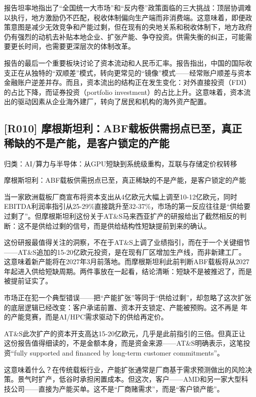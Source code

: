 \documentclass[11pt]{ctexart}
\begin{document}
报告坦率地指出了“全国统一大市场”和“反内卷”政策面临的三大挑战：顶层协调难以执行，地方激励仍不匹配，税收体制偏向生产端而非消费端。这意味着，即便政策意图是减少无效竞争和产能过剩，但在现有的央地关系和税收体制下，地方政府仍有强烈的动机去补贴本地企业、扩张产能、争夺投资。供需失衡的纠正，可能需要更长时间，也需要更深层次的体制改革。

报告的最后一个重要板块讨论了资本流动和人民币汇率。报告指出，中国的国际收支正在从独特的“双顺差”模式，转向更常见的“镜像”模式——经常账户顺差与资本金融账户逆差并存。而且，资本流出的结构正在发生变化：对外直接投资（FDI）的占比下降，而证券投资（portfolio investment）的占比上升。这意味着，资本流出的驱动因素从企业海外建厂，转向了居民和机构的海外资产配置。

\subsection{[R010] 摩根斯坦利：ABF载板供需拐点已至，真正稀缺的不是产能，是客户锁定的产能}
{\small\color{refgray}归类：AI/算力与半导体：从GPU短缺到系统级重构，互联与存储定价权转移}

摩根斯坦利：ABF载板供需拐点已至，真正稀缺的不是产能，是客户锁定的产能

当一家欧洲载板厂商宣布将资本支出从4亿欧元大幅上调至10-12亿欧元，同时EBITDA利润率指引从25-29\%直接跳升至32-37\%，市场的第一反应往往是“供给要过剩了”。但摩根斯坦利这份关于AT\&S马来西亚扩产的研报给出了截然相反的判断：这不是供给过剩的信号，而是供给结构性短缺提前到来的确认。

这份研报最值得关注的洞察，不在于AT\&S上调了业绩指引，而在于一个关键细节——AT\&S追加的15-20亿欧元投资，是在现有厂区增加生产线，而非新建工厂。这意味着新产能将在2027年3月前落地。而摩根斯坦利此前判断ABF载板将从2027年起进入供给短缺周期。两件事放在一起看，结论清晰：短缺不是被推迟了，而是被提前证实了。

市场正在犯一个典型错误——把“产能扩张”等同于“供给过剩”，却忽略了这次扩张的底层逻辑已经改变：客户承诺前置、资本开支锁定、产能被预购。这不再是 年的产能竞赛，而是AI/HPC需求驱动下的供给再定价。

AT\&S此次扩产的资本开支高达15-20亿欧元，几乎是此前指引的三倍。但真正让这份报告值得细读的，不是金额本身，而是资金来源——AT\&S明确表示，这笔投资“fully supported and financed by long-term customer commitments”。

这意味着什么？在传统载板行业，产能扩张通常是厂商基于需求预测做出的风险决策。景气时扩产，低谷时承担闲置成本。但这次，客户——AMD和另一家大型科技公司——直接为产能买单。这不是“厂商赌需求”，而是“客户锁产能”。
\end{document}

